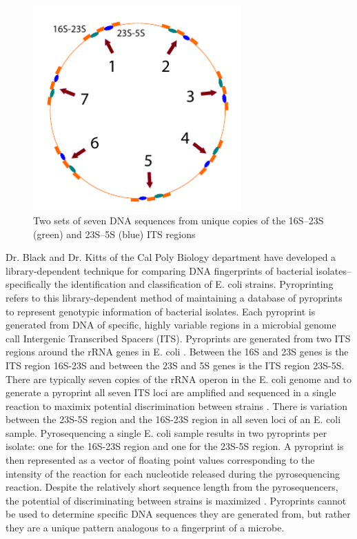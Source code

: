 \begin{figure}
\begin{center}
\includegraphics[width=80mm]{images/dna.pdf}
\caption{Two sets of seven DNA sequences from unique copies of the 16S–23S (green) and 23S–5S (blue) ITS regions}
\label{fig:dna}
\end{center}
\end{figure}

Dr. Black and Dr. Kitts of the Cal Poly Biology department have developed a library-dependent technique for comparing DNA fingerprints of bacterial isolates--specifically the identification and classification of E. coli strains. Pyroprinting refers to this library-dependent method of maintaining a database of pyroprints to represent genotypic information of bacterial isolates. Each pyroprint is generated from DNA of specific, highly variable regions in a microbial genome \cite{JanSoliman} call Intergenic Transcribed Spacers (ITS). Pyroprints are generated from two ITS regions around the rRNA genes in E. coli \cite{JanSoliman}. Between the 16S and 23S genes is the ITS region 16S-23S and between the 23S and 5S genes is the ITS region 23S-5S. There are typically seven copies of the rRNA operon in the E. coli genome and to generate a pyroprint all seven ITS loci are amplified and sequenced in a single reaction to maximix potential discrimination between strains \cite{JanSoliman}. There is variation between the 23S-5S region and the 16S-23S region in all seven loci of an E. coli sample. Pyrosequencing a single E. coli sample results in two pyroprints per isolate: one for the 16S-23S region and one for the 23S-5S region. A pyroprint is then represented as a vector of floating point values corresponding to the intensity of the reaction for each nucleotide released during the pyrosequencing reaction. Despite the relatively short sequence length from the pyrosequencers, the potential of discriminating between strains is maximized \cite{JanSoliman}. Pyroprints cannot be used to determine specific DNA sequences they are generated from, but rather they are a unique pattern analogous to a fingerprint of a microbe.

